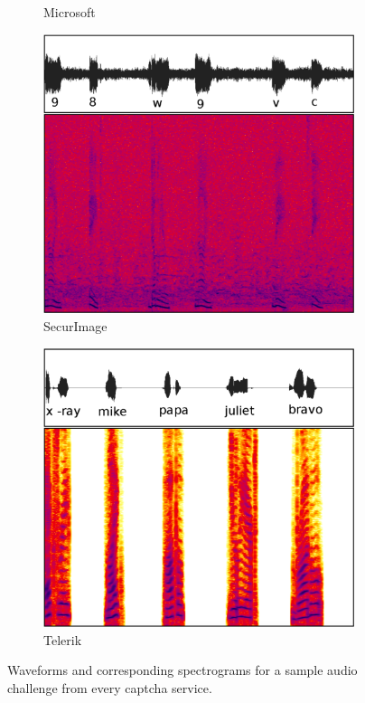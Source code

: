 \begin{figure}[tp]
\begin{subfigure}{0.3\textwidth}
        \caption{Microsoft}
        \label{fig:live}
\end{subfigure}\hspace{0.03\textwidth} 
\begin{subfigure}{0.3\textwidth}
        \includegraphics[width=\textwidth]{figures/secure.pdf}
        \caption{SecurImage}
        \label{fig:secure}
\end{subfigure}\hspace{0.03\textwidth}
\begin{subfigure}{0.3\textwidth}
        \includegraphics[width=\textwidth]{figures/telerik.pdf}
        \caption{Telerik}
        \label{fig:telerik}
\end{subfigure}
\caption{Waveforms and corresponding spectrograms for a sample audio challenge from every captcha service.}
\label{fig:examples}
\end{figure}

